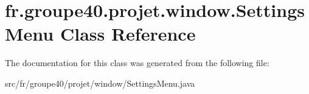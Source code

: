 \hypertarget{classfr_1_1groupe40_1_1projet_1_1window_1_1_settings_menu}{}\section{fr.\+groupe40.\+projet.\+window.\+Settings\+Menu Class Reference}
\label{classfr_1_1groupe40_1_1projet_1_1window_1_1_settings_menu}


The documentation for this class was generated from the following file\+:\begin{DoxyCompactItemize}
\item 
src/fr/groupe40/projet/window/Settings\+Menu.\+java\end{DoxyCompactItemize}
